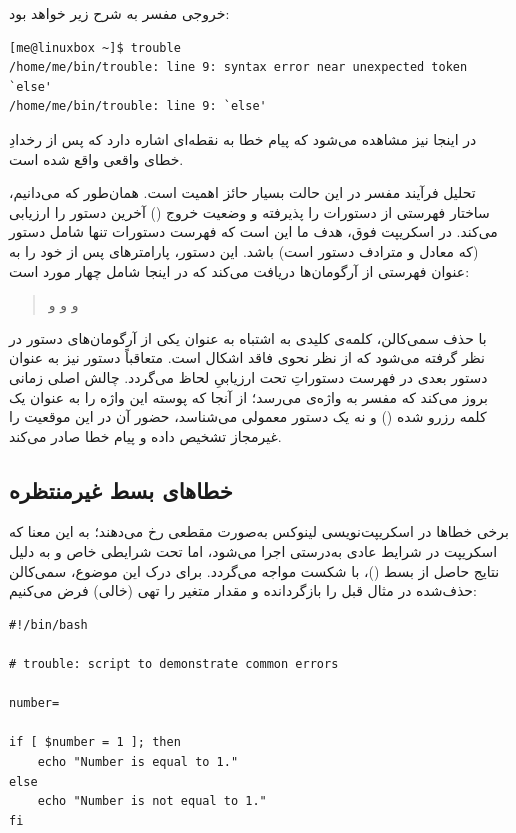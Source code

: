 خروجی مفسر به شرح زیر خواهد بود:

\begin{latin}
\begin{lstlisting}
[me@linuxbox ~]$ trouble
/home/me/bin/trouble: line 9: syntax error near unexpected token `else'
/home/me/bin/trouble: line 9: `else'
\end{lstlisting}
\end{latin}

در اینجا نیز مشاهده می‌شود که پیام خطا به نقطه‌ای اشاره دارد که پس از رخدادِ خطای واقعی واقع شده است.

تحلیل فرآیند مفسر در این حالت بسیار حائز اهمیت است. همان‌طور که می‌دانیم، ساختار  فهرستی از دستورات را پذیرفته و وضعیت خروج () آخرین دستور را ارزیابی می‌کند. در اسکریپت فوق، هدف ما این است که فهرست دستورات تنها شامل دستور \cmd{]} (که معادل و مترادف دستور  است) باشد. این دستور، پارامترهای پس از خود را به عنوان فهرستی از آرگومان‌ها دریافت می‌کند که در اینجا شامل چهار مورد است:

\begin{quote}
 و \lr{=} و  و \lr{]}
\end{quote}

با حذف سمی‌کالن، کلمه‌ی کلیدی  به اشتباه به عنوان یکی از آرگومان‌های دستور \cmd{]} در نظر گرفته می‌شود که از نظر نحوی فاقد اشکال است. متعاقباً دستور  نیز به عنوان دستور بعدی در فهرست دستوراتِ تحت ارزیابیِ  لحاظ می‌گردد. چالش اصلی زمانی بروز می‌کند که مفسر به واژه‌ی  می‌رسد؛ از آنجا که پوسته این واژه را به عنوان یک کلمه رزرو شده () و نه یک دستور معمولی می‌شناسد، حضور آن در این موقعیت را غیرمجاز تشخیص داده و پیام خطا صادر می‌کند.

\subsection{خطاهای بسط غیرمنتظره}

برخی خطاها در اسکریپت‌نویسی لینوکس به‌صورت مقطعی رخ می‌دهند؛ به این معنا که اسکریپت در شرایط عادی به‌درستی اجرا می‌شود، اما تحت شرایطی خاص و به دلیل نتایج حاصل از بسط ()، با شکست مواجه می‌گردد. برای درک این موضوع، سمی‌کالن حذف‌شده در مثال قبل را بازگردانده و مقدار متغیر  را تهی (خالی) فرض می‌کنیم:

\begin{latin}
\begin{lstlisting}
#!/bin/bash

# trouble: script to demonstrate common errors

number=

if [ $number = 1 ]; then
    echo "Number is equal to 1."
else
    echo "Number is not equal to 1."
fi
\end{lstlisting}
\end{latin}


